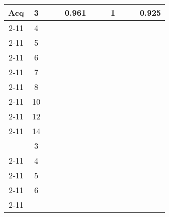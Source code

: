 \begin{table}[]
\begin{longtable}{c|c|l|l|l|l|l|l|l|l|l|}
\multicolumn{1}{|c|}{\multirow{9}{*}{Acq}}  & 3                       &       &       & 0.961   &          &         & 1         &         &        & 0.925    \\ \cline{2-11} 
\multicolumn{1}{|c|}{}                      & 4                       &       &       &         &          &         &           &         &        &          \\ \cline{2-11} 
\multicolumn{1}{|c|}{}                      & 5                       &       &       &         &          &         &           &         &        &          \\ \cline{2-11} 
\multicolumn{1}{|c|}{}                      & 6                       &       &       &         &          &         &           &         &        &          \\ \cline{2-11} 
\multicolumn{1}{|c|}{}                      & 7                       &       &       &         &          &         &           &         &        &          \\ \cline{2-11} 
\multicolumn{1}{|c|}{}                      & 8                       &       &       &         &          &         &           &         &        &          \\ \cline{2-11} 
\multicolumn{1}{|c|}{}                      & 10                      &       &       &         &          &         &           &         &        &          \\ \cline{2-11} 
\multicolumn{1}{|c|}{}                      & 12                      &       &       &         &          &         &           &         &        &          \\ \cline{2-11} 
\multicolumn{1}{|c|}{}                      & 14                      &       &       &         &          &         &           &         &        &          \\ \hline
                                            & 3                       &       &       &         &          &         &           &         &        &          \\ \cline{2-11} 
                                            & 4                       &       &       &         &          &         &           &         &        &          \\ \cline{2-11} 
                                            & 5                       &       &       &         &          &         &           &         &        &          \\ \cline{2-11} 
                                            & 6                       &       &       &         &          &         &           &         &        &          \\ \cline{2-11} 

\end{longtable}
\end{table}
